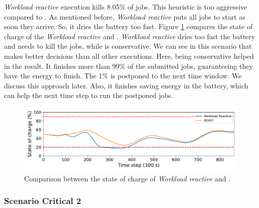 \emph{Workload reactive} execution kills 8.05\% of jobs. This heuristic is too aggressive compared to \emph{\systemName}. As mentioned before, \emph{Workload reactive} puts all jobs to start as soon they arrive. So, it dries the battery too fast. Figure \ref{fig:critical_soc_s1} compares the state of charge of the \emph{Workload reactive} and \emph{\systemName}. \emph{Workload reactive} dries too fast the battery and needs to kill the jobs, while \emph{\systemName} is conservative. We can see in this scenario that \emph{\systemName} makes better decisions than all other executions. Here, being conservative helped in the result. It finishes more than 99\% of the submitted jobs, guaranteeing they have the energy to finish. The 1\% is postponed to the next time window. We discuss this approach later. Also, it finishes saving energy in the battery, which can help the next time step to run the postponed jobs.

\begin{figure}[!htb]
    \centering
    \includegraphics[scale=0.5]{Images/Heuristic/critical_soc_s1.pdf}
    \caption{Comparison between the state of charge of \emph{Workload reactive} and \emph{\systemName}.}
    \label{fig:critical_soc_s1}
\end{figure}

\clearpage

\subsubsection{Scenario Critical 2}

